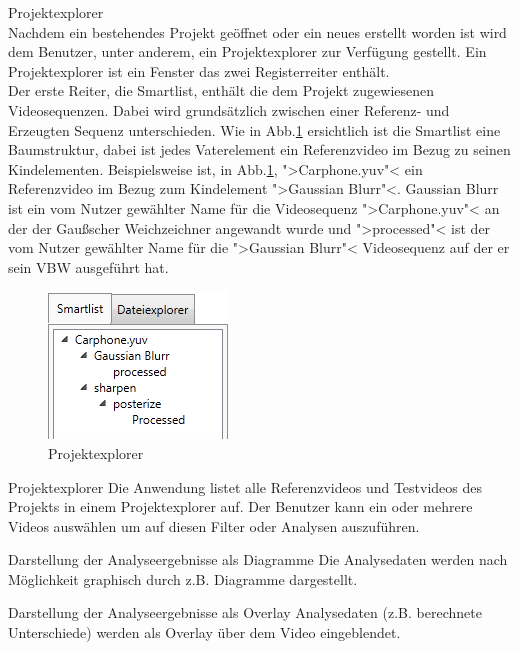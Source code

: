  Projektexplorer \\
Nachdem ein bestehendes Projekt geöffnet oder ein neues erstellt worden ist wird dem
Benutzer, unter anderem, ein Projektexplorer zur Verfügung gestellt. Ein Projektexplorer ist ein 
Fenster das zwei Registerreiter enthält. \\
Der erste Reiter, die Smartlist, enthält die dem Projekt zugewiesenen Videosequenzen. Dabei wird
grundsätzlich zwischen einer Referenz- und Erzeugten Sequenz unterschieden. Wie in Abb.\ref{pExplorer}
ersichtlich ist die Smartlist eine Baumstruktur, dabei ist jedes Vaterelement
ein Referenzvideo im Bezug zu seinen Kindelementen. Beispielsweise ist, in Abb.\ref{pExplorer}, 
">Carphone.yuv"< ein Referenzvideo im Bezug zum Kindelement ">Gaussian Blurr"<. Gaussian Blurr ist ein
vom Nutzer gewählter Name für die Videosequenz ">Carphone.yuv"< an der der Gaußscher Weichzeichner angewandt
wurde und ">processed"< ist der vom Nutzer gewählter Name für die ">Gaussian Blurr"< Videosequenz auf
der er sein \gls{VBW} ausgeführt hat.
\begin{figure}[h]
\includegraphics[scale=1]{bilder/projektexplorer.png}
\caption{Projektexplorer}
\label{pExplorer}
\end{figure}
 Projektexplorer
\newline
Die Anwendung listet alle Referenzvideos und Testvideos des Projekts in einem Projektexplorer auf. Der
 Benutzer kann ein oder mehrere Videos auswählen um auf diesen Filter oder Analysen auszuführen.

 Darstellung der Analyseergebnisse als Diagramme
\newline
Die Analysedaten werden nach Möglichkeit graphisch durch z.B. Diagramme dargestellt.

 Darstellung der Analyseergebnisse als Overlay
\newline
Analysedaten (z.B. berechnete Unterschiede) werden als Overlay über dem Video eingeblendet.

